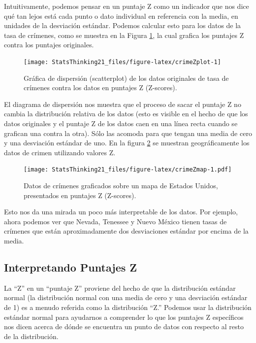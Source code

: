 \documentclass[
  12pt,
]{book}
\begin{document}
Intuitivamente, podemos pensar en un puntaje Z como un indicador que nos dice qué tan lejos está cada punto o dato individual en referencia con la media, en unidades de la desviación estándar. Podemos calcular esto para los datos de la tasa de crímenes, como se muestra en la Figura \ref{fig:crimeZplot}, la cual grafica los puntajes Z contra los puntajes originales.

\begin{figure}
\texttt{[image: StatsThinking21\_files/figure-latex/crimeZplot-1]} \caption{Gráfica de dispersión (scatterplot) de los datos originales de tasa de crímenes contra los datos en puntajes Z (Z-scores).}\label{fig:crimeZplot}
\end{figure}

El diagrama de dispersión nos muestra que el proceso de sacar el puntaje Z no cambia la distribución relativa de los datos (esto es visible en el hecho de que los datos originales y el puntaje Z de los datos caen en una línea recta cuando se grafican una contra la otra). Sólo las acomoda para que tengan una media de cero y una desviación estándar de uno. En la figura \ref{fig:crimeZmap} se muestran geográficamente los datos de crimen utilizando valores Z.

\begin{figure}
\centering
\texttt{[image: StatsThinking21\_files/figure-latex/crimeZmap-1.pdf]}
\caption{\label{fig:crimeZmap}Datos de crímenes graficados sobre un mapa de Estados Unidos, presentados en puntajes Z (Z-scores).}
\end{figure}

Esto nos da una mirada un poco más interpretable de los datos. Por ejemplo, ahora podemos ver que Nevada, Tenessee y Nuevo México tienen tasas de crímenes que están aproximadamente dos desviaciones estándar por encima de la media.

\hypertarget{interpretando-puntajes-z}{%
\subsection{Interpretando Puntajes Z}\label{interpretando-puntajes-z}}

La ``Z'' en un ``puntaje Z'' proviene del hecho de que la distribución estándar normal (la distribución normal con una media de cero y una desviación estándar de 1) es a menudo referida como la distribución ``Z.'' Podemos usar la distribución estándar normal para ayudarnos a comprender lo que los puntajes Z específicos nos dicen acerca de dónde se encuentra un punto de datos con respecto al resto de la distribución.
\end{document}
